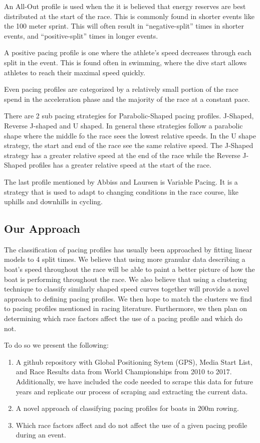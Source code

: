 \documentclass[11pt,]{article}
\begin{document}
An All-Out profile is used when the it is believed that energy reserves
are best distributed at the start of the race. This is commonly found in
shorter events like the 100 meter sprint. This will often result in
``negative-split'' times in shorter events, and ``positive-split'' times
in longer events.

A positive pacing profile is one where the athlete's speed decreases
through each split in the event. This is found often in swimming, where
the dive start allows athletes to reach their maximal speed quickly.

Even pacing profiles are categorized by a relatively small portion of
the race spend in the acceleration phase and the majority of the race at
a constant pace.

There are 2 sub pacing strategies for Parabolic-Shaped pacing profiles.
J-Shaped, Reverse J-shaped and U shaped. In general these strategies
follow a parabolic shape where the middle fo the race sees the lowest
relative speeds. In the U shape strategy, the start and end of the race
see the same relative speed. The J-Shaped strategy has a greater
relative speed at the end of the race while the Reverse J-Shaped
profiles has a greater relative speed at the start of the race.

The last profile mentioned by Abbiss and Laursen is Variable Pacing. It
is a strategy that is used to adapt to changing conditions in the race
course, like uphills and downhills in cycling.

\subsection{Our Approach}\label{our-approach}

The classification of pacing profiles has usually been approached by
fitting linear models to 4 split times. We believe that using more
granular data describing a boat's speed throughout the race will be able
to paint a better picture of how the boat is performing throughout the
race. We also believe that using a clustering technique to classify
similarly shaped speed curves together will provide a novel approach to
defining pacing profiles. We then hope to match the clusters we find to
pacing profiles mentioned in racing literature. Furthermore, we then
plan on determining which race factors affect the use of a pacing
profile and which do not.

To do so we present the following:

\begin{enumerate}
\def\labelenumi{\arabic{enumi}.}
\item
  A github repository with Global Positioning Sytem (GPS), Media Start
  List, and Race Results data from World Championships from 2010 to
  2017. Additionally, we have included the code needed to scrape this
  data for future years and replicate our process of scraping and
  extracting the current data.
\item
  A novel approach of classifying pacing profiles for boats in 200m
  rowing.
\item
  Which race factors affect and do not affect the use of a given pacing
  profile during an event.
\end{enumerate}
\end{document}

